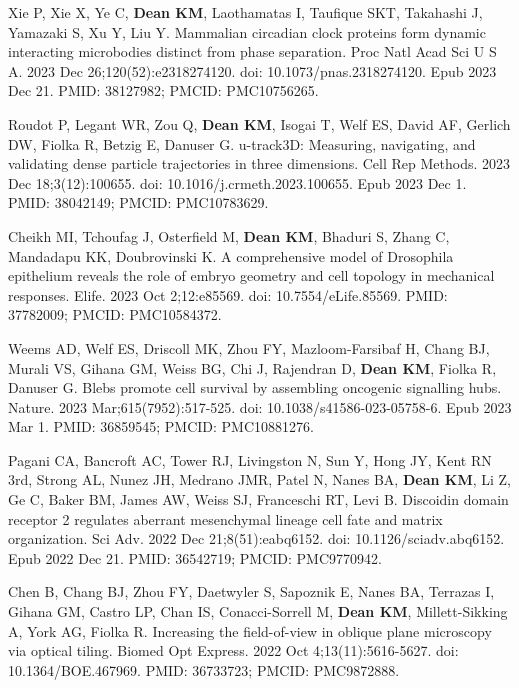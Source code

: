 \begin{etaremune}
\item Xie P, Xie X, Ye C, \textbf{Dean KM}, Laothamatas I, Taufique SKT, Takahashi J, Yamazaki S, Xu Y, Liu Y. Mammalian circadian clock proteins form dynamic interacting microbodies distinct from phase separation. Proc Natl Acad Sci U S A. 2023 Dec 26;120(52):e2318274120. doi: 10.1073/pnas.2318274120. Epub 2023 Dec 21. PMID: 38127982; PMCID: PMC10756265.

\item Roudot P, Legant WR, Zou Q, \textbf{Dean KM}, Isogai T, Welf ES, David AF, Gerlich DW, Fiolka R, Betzig E, Danuser G. u-track3D: Measuring, navigating, and validating dense particle trajectories in three dimensions. Cell Rep Methods. 2023 Dec 18;3(12):100655. doi: 10.1016/j.crmeth.2023.100655. Epub 2023 Dec 1. PMID: 38042149; PMCID: PMC10783629.

\item Cheikh MI, Tchoufag J, Osterfield M, \textbf{Dean KM}, Bhaduri S, Zhang C, Mandadapu KK, Doubrovinski K. A comprehensive model of Drosophila epithelium reveals the role of embryo geometry and cell topology in mechanical responses. Elife. 2023 Oct 2;12:e85569. doi: 10.7554/eLife.85569. PMID: 37782009; PMCID: PMC10584372.

\item Weems AD, Welf ES, Driscoll MK, Zhou FY, Mazloom-Farsibaf H, Chang BJ, Murali VS, Gihana GM, Weiss BG, Chi J, Rajendran D, \textbf{Dean KM}, Fiolka R, Danuser G. Blebs promote cell survival by assembling oncogenic signalling hubs. Nature. 2023 Mar;615(7952):517-525. doi: 10.1038/s41586-023-05758-6. Epub 2023 Mar 1. PMID: 36859545; PMCID: PMC10881276.

\item Pagani CA, Bancroft AC, Tower RJ, Livingston N, Sun Y, Hong JY, Kent RN 3rd, Strong AL, Nunez JH, Medrano JMR, Patel N, Nanes BA, \textbf{Dean KM}, Li Z, Ge C, Baker BM, James AW, Weiss SJ, Franceschi RT, Levi B. Discoidin domain receptor 2 regulates aberrant mesenchymal lineage cell fate and matrix organization. Sci Adv. 2022 Dec 21;8(51):eabq6152. doi: 10.1126/sciadv.abq6152. Epub 2022 Dec 21. PMID: 36542719; PMCID: PMC9770942.

\item Chen B, Chang BJ, Zhou FY, Daetwyler S, Sapoznik E, Nanes BA, Terrazas I, Gihana GM, Castro LP, Chan IS, Conacci-Sorrell M, \textbf{Dean KM}, Millett-Sikking A, York AG, Fiolka R. Increasing the field-of-view in oblique plane microscopy via optical tiling. Biomed Opt Express. 2022 Oct 4;13(11):5616-5627. doi: 10.1364/BOE.467969. PMID: 36733723; PMCID: PMC9872888.


\end{etaremune}
